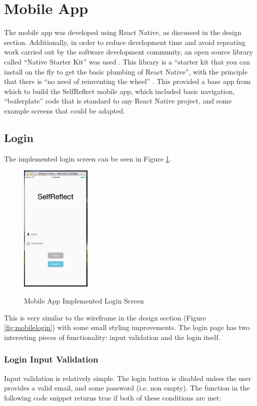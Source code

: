 \documentclass[11pt,openright,a4paper]{report}
\begin{document}
\section{Mobile App}
The mobile app was developed using React Native, as discussed in the design section. Additionally, in order to reduce development time and avoid repeating work carried out by the software development community, an open source library called \enquote{Native Starter Kit} was used \parencite{nativestarterkit}. This library is a \enquote{starter kit that you can install on the fly to get the basic plumbing of React Native}, with the principle that there is \enquote{no need of reinventing the wheel} \parencite{nativestarterkit}. This provided a base app from which to build the SelfReflect mobile app, which included basic navigation, \enquote{boilerplate} code that is standard to any React Native project, and some example screens that could be adapted.

\subsection{Login}
The implemented login screen can be seen in Figure \ref{fig:mobileloginimpl}.

\begin{figure}[ht]
\centering
\caption{Mobile App Implemented Login Screen}
\includegraphics[width=0.3\textwidth]{i/mobileloginimpl.png}
\label{fig:mobileloginimpl}
\end{figure}

This is very similar to the wireframe in the design section (Figure \ref{fig:mobilelogin}) with some small styling improvements. The login page has two interesting pieces of functionality: input validation and the login itself.

\subsubsection{Login Input Validation}
Input validation is relatively simple. The login button is disabled unless the user provides a valid email, and some password (i.e. non empty). The function in the following code snippet returns true if both of these conditions are met:
\end{document}
